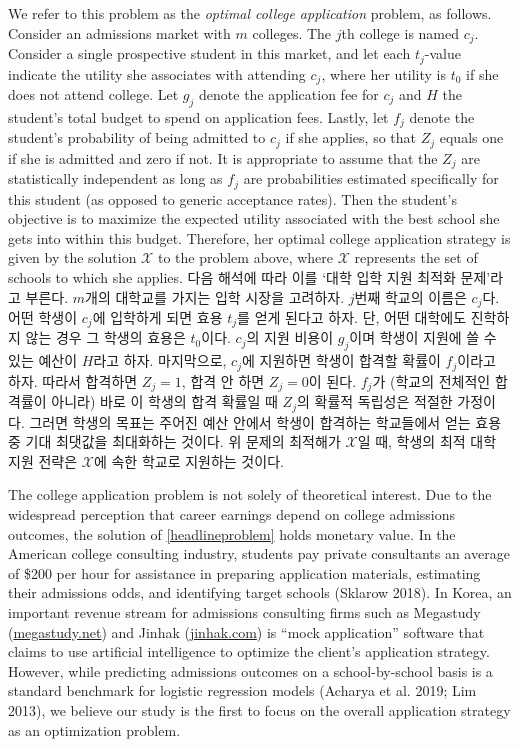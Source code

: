 \documentclass[11pt]{article} %
\theoremstyle{definition}
\theoremstyle{definition}
\begin{document}
\ifen
We refer to this problem as the \emph{optimal college application} problem, as follows. Consider an admissions market with $m$ colleges. The $j$th college is named $c_j$. Consider a single prospective student in this market, and let each $t_j$-value indicate the utility she associates with attending $c_j$, where her utility is $t_0$ if she does not attend college. Let $g_j$ denote the application fee for $c_j$ and $H$ the student's total budget to spend on application fees. Lastly, let $f_j$ denote the student's probability of being admitted to $c_j$ if she applies, so that $Z_j$ equals one if she is admitted and zero if not. It is appropriate to assume that the $Z_j$ are statistically independent as long as $f_j$ are probabilities estimated specifically for this student (as opposed to generic acceptance rates). Then the student's objective is to maximize the expected utility associated with the best school she gets into within this budget. Therefore, her optimal college application strategy is given by the solution $\mathcal{X}$ to the problem above, where $\mathcal{X}$ represents the set of schools to which she applies. 
\else
다음 해석에 따라 이를 `대학 입학 지원 최적화 문제'라고 부른다. $m$개의 대학교를 가지는 입학 시장을 고려하자. $j$번째 학교의 이름은 $c_j$다. 어떤 학생이 $c_j$에 입학하게 되면 효용 $t_j$를 얻게 된다고 하자. 단, 어떤 대학에도 진학하지 않는 경우 그 학생의 효용은 $t_0$이다. $c_j$의 지원 비용이 $g_j$이며 학생이 지원에 쓸 수 있는 예산이 $H$라고 하자. 마지막으로, $c_j$에 지원하면 학생이 합격할 확률이 $f_j$이라고 하자. 따라서 합격하면 $Z_j = 1$, 합격 안 하면 $Z_j = 0$이 된다. $f_j$가 (학교의 전체적인 합격률이 아니라) 바로 이 학생의 합격 확률일 때 $Z_j$의 확률적 독립성은 적절한 가정이다. 그러면 학생의 목표는 주어진 예산 안에서 학생이 합격하는 학교들에서 얻는 효용 중 기대 최댓값을 최대화하는 것이다. 위 문제의 최적해가 $\mathcal{X}$일 때, 학생의 최적 대학 지원 전략은 $\mathcal{X}$에  속한 학교로 지원하는 것이다.
\fi

\ifen
The college application problem is not solely of theoretical interest. Due to the widespread perception that career earnings depend on college admissions outcomes, the solution of \eqref{headlineproblem} holds monetary value. In the American college consulting industry, students pay private consultants an average of \$200 per hour for assistance in preparing application materials, estimating their admissions odds, and identifying target schools (Sklarow 2018). In Korea, an important revenue stream for admissions consulting firms such as Megastudy (\url{megastudy.net}) and Jinhak (\url{jinhak.com}) is ``mock application'' software that claims to use artificial intelligence to optimize the client's application strategy. However, while predicting admissions outcomes on a school-by-school basis is a standard benchmark for logistic regression models (Acharya et al. 2019; Lim 2013), we believe our study is the first to focus on the overall application strategy as an optimization problem.
\end{document}

